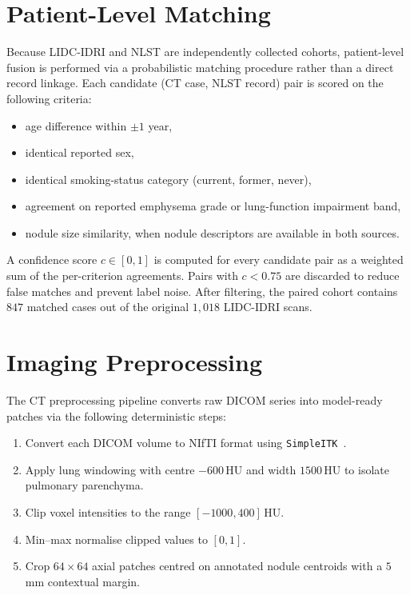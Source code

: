 \section{Patient-Level Matching}
\label{sec:patient-matching}

Because LIDC-IDRI and NLST are independently collected cohorts, patient-level
fusion is performed via a probabilistic matching procedure rather than a
direct record linkage. Each candidate (CT case, NLST record) pair is scored
on the following criteria:

\begin{itemize}
    \item age difference within $\pm 1$ year,
    \item identical reported sex,
    \item identical smoking-status category (current, former, never),
    \item agreement on reported emphysema grade or lung-function impairment
          band,
    \item nodule size similarity, when nodule descriptors are available in
          both sources.
\end{itemize}

A confidence score $c \in [0, 1]$ is computed for every candidate pair as a
weighted sum of the per-criterion agreements. Pairs with $c < 0.75$ are
discarded to reduce false matches and prevent label noise. After filtering,
the paired cohort contains $847$ matched cases out of the original $1{,}018$
LIDC-IDRI scans.

\section{Imaging Preprocessing}
\label{sec:imaging-preproc}

The CT preprocessing pipeline converts raw DICOM series into model-ready
patches via the following deterministic steps:

\begin{enumerate}
    \item Convert each DICOM volume to NIfTI format using
          \texttt{SimpleITK}~\cite{muschelli2014simpleitk}.
    \item Apply lung windowing with centre $-600$\,HU and width $1500$\,HU to
          isolate pulmonary parenchyma.
    \item Clip voxel intensities to the range $[-1000, 400]$\,HU.
    \item Min--max normalise clipped values to $[0, 1]$.
    \item Crop $64 \times 64$ axial patches centred on annotated nodule
          centroids with a $5$\,mm contextual margin.
\end{enumerate}

